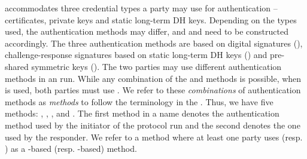 \mEdhoc{} accommodates three credential types
a party may use for authentication -- certificates, private keys
and static long-term DH keys.
%
Depending on the types used, the authentication methods may differ,
and \mAuthi{} and \mAuthr{} need to be constructed accordingly.
%
The three authentication methods are based on digital signatures (\mSig),
challenge-response signatures based on static long-term DH keys (\mStat) and
pre-shared symmetric keys (\mPsk).
%
The two parties may use different authentication methods in an \mEdhoc{} run.
%
While any combination of the \mSig{} and \mStat{} methods is possible,
when \mPsk{} is used, both parties must use \mPsk{}.
%
We refer to these \emph{combinations} of authentication methods as
\emph{methods} to follow the terminology in the \mSpec{}.
%
Thus, we have five methods: \mSigSig, \mSigStat, \mStatStat, \mStatSig{} and
\mPskPsk.
%
The first method in a name denotes the
authentication method used by the initiator of the protocol run and the second denotes the
one used by the responder.
%
We refer to a method where at least one party uses \mSig{} (resp. \mStat) as a \mSig-based (resp. \mStat-based)
method.
%

%

 
